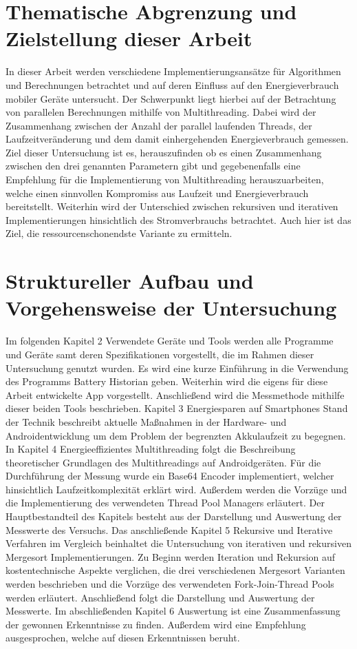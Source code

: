 \section{Thematische Abgrenzung und Zielstellung dieser Arbeit}
In dieser Arbeit werden verschiedene Implementierungsansätze für Algorithmen und Berechnungen betrachtet und auf deren Einfluss auf den Energieverbrauch mobiler Geräte untersucht. Der Schwerpunkt liegt hierbei auf der Betrachtung von parallelen Berechnungen mithilfe von Multithreading. Dabei wird der Zusammenhang zwischen der Anzahl der parallel laufenden Threads, der Laufzeitveränderung und dem damit einhergehenden Energieverbrauch gemessen.
Ziel dieser Untersuchung ist es, herauszufinden ob es einen Zusammenhang zwischen den drei genannten Parametern gibt und gegebenenfalls eine Empfehlung für die Implementierung von Multithreading herauszuarbeiten, welche einen sinnvollen Kompromiss aus Laufzeit und Energieverbrauch bereitstellt.
Weiterhin wird der Unterschied zwischen rekursiven und iterativen Implementierungen hinsichtlich des Stromverbrauchs betrachtet. Auch hier ist das Ziel, die ressourcenschonendste Variante zu ermitteln.


\section{Struktureller Aufbau und Vorgehensweise der Untersuchung}

Im folgenden Kapitel 2 \glqq Verwendete Geräte und Tools\grqq{} werden alle Programme und Geräte samt deren Spezifikationen vorgestellt, die im Rahmen dieser Untersuchung genutzt wurden. Es wird eine kurze Einführung in die Verwendung des Programms Battery Historian geben. Weiterhin wird die eigens für diese Arbeit entwickelte App vorgestellt. Anschließend wird die Messmethode mithilfe dieser beiden Tools beschrieben.
Kapitel 3 \glqq Energiesparen auf Smartphones Stand der Technik\grqq{} beschreibt aktuelle Maßnahmen in der Hardware- und Androidentwicklung um dem Problem der begrenzten Akkulaufzeit zu begegnen.
In Kapitel 4 \glqq Energieeffizientes Multithreading\grqq{} folgt die Beschreibung theoretischer Grundlagen des Multithreadings auf Androidgeräten. Für die Durchführung der Messung wurde ein Base64 Encoder implementiert, welcher hinsichtlich Laufzeitkomplexität erklärt wird. Außerdem werden die Vorzüge und die Implementierung des verwendeten Thread Pool Managers erläutert.
Der Hauptbestandteil des Kapitels besteht aus der Darstellung und Auswertung der Messwerte des Versuchs.
Das anschließende Kapitel 5 \glqq Rekursive und Iterative Verfahren im Vergleich\grqq{} beinhaltet die Untersuchung von iterativen und rekursiven Mergesort Implementierungen. Zu Beginn werden Iteration und Rekursion auf kostentechnische Aspekte verglichen, die drei verschiedenen Mergesort Varianten werden beschrieben und die Vorzüge des verwendeten Fork-Join-Thread Pools werden erläutert. Anschließend folgt die Darstellung und Auswertung der Messwerte.
Im abschließenden Kapitel 6 \glqq Auswertung\grqq{} ist eine Zusammenfassung der gewonnen Erkenntnisse zu finden. Außerdem wird eine Empfehlung ausgesprochen, welche auf diesen Erkenntnissen beruht.

